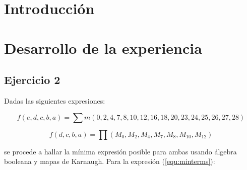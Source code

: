 \documentclass[a4paper]{article}
\begin{document}




\section*{Introducción}


\section*{Desarrollo de la experiencia}


\subsection*{Ejercicio 2}

Dadas las siguientes expresiones:

\begin{equation}
f \left( e,d,c,b,a \right) = \sum m \left( 0,2,4,7,8,10,12,16,18,20,23,24,25,26,27,28 \right)
\label{equ:minterms}
\end{equation}

\begin{equation}
f \left( d,c,b,a \right) = \prod \left( M_0,M_2,M_4,M_7,M_8,M_{10},M_{12} \right)
\label{equ:maxterms}
\end{equation}

se procede a hallar la mínima expresión posible para ambas usando álgebra booleana y mapas de Karnaugh.
Para la expresión (\ref{equ:minterms}):
\end{document}
